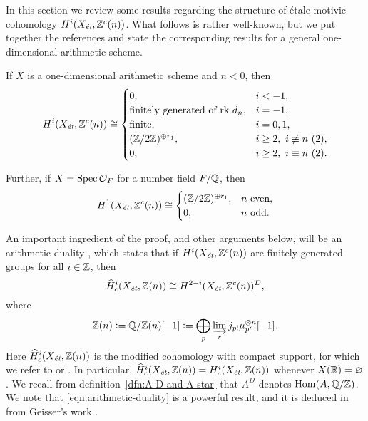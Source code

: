 \documentclass[draft]{article}
\numberwithin{equation}{section}
\begin{document}
In this section we review some results regarding the structure of \'{e}tale motivic
cohomology $H^i (X_\et, \ZZ^c(n))$. What follows is rather well-known, but we
put together the references and state the corresponding results for a general
one-dimensional arithmetic scheme.

\begin{proposition}
  \label{prop:structure-of-motivic-cohomology}
  If $X$ is a one-dimensional arithmetic scheme and $n < 0$, then
  \begin{equation}
    \label{eqn:structure-of-motivic-cohomology}
    H^i (X_\et, \ZZ^c (n)) \cong
    \begin{cases}
      0, & i < -1, \\
      \text{finitely generated of rk } d_n, & i = -1, \\
      \text{finite}, & i = 0,1, \\
      (\ZZ/2\ZZ)^{\oplus r_1}, & i \ge 2, ~ i\not\equiv n ~ (2), \\
      0, & i \ge 2, ~ i\equiv n ~ (2).
    \end{cases}
  \end{equation}

  Further, if $X = \Spec \mathcal{O}_F$ for a number field $F/\QQ$, then
  \begin{equation}
    \label{eqn:2-torsion-in-H1-Zc-for-Spec-OF}
    H^1 (X_\et, \ZZ^c (n)) \cong
    \begin{cases}
      (\ZZ/2\ZZ)^{\oplus r_1}, & n\text{ even}, \\
      0, & n \text{ odd}.
    \end{cases}
  \end{equation}
\end{proposition}

An important ingredient of the proof, and other arguments below, will be an
arithmetic duality \cite[Theorem~I]{Beshenov-Weil-etale-1}, which states that if
$H^i (X_\et, \ZZ^c (n))$ are finitely generated groups for all $i \in \ZZ$, then
\begin{equation}
  \label{eqn:arithmetic-duality}
  \widehat{H}^i_c (X_\et, \ZZ (n)) \cong
  H^{2-i} (X_\et, \ZZ^c (n))^D,
\end{equation}
where
\[ \ZZ (n) \dfn \QQ/\ZZ (n) [-1] \dfn
  \bigoplus_p \varinjlim_r j_{p!} \mu_{p^r}^{\otimes n} [-1]. \]
Here $\widehat{H}^i_c (X_\et, \ZZ (n))$ is the modified cohomology with compact
support, for which we refer to \cite[Appendix~B]{Beshenov-Weil-etale-1} or
\cite[\S 2]{Geisser-Schmidt-2018}. In particular,
$\widehat{H}^i_c (X_\et, \ZZ (n)) = H^i_c (X_\et, \ZZ (n))$ whenever
$X (\RR) = \emptyset$.
We recall from definition~\ref{dfn:A-D-and-A-star} that $A^D$ denotes
$\Hom (A, \QQ/\ZZ)$. We note that \eqref{eqn:arithmetic-duality} is a powerful
result, and it is deduced in \cite{Beshenov-Weil-etale-1} from Geisser's work
\cite{Geisser-2010}.
\end{document}
